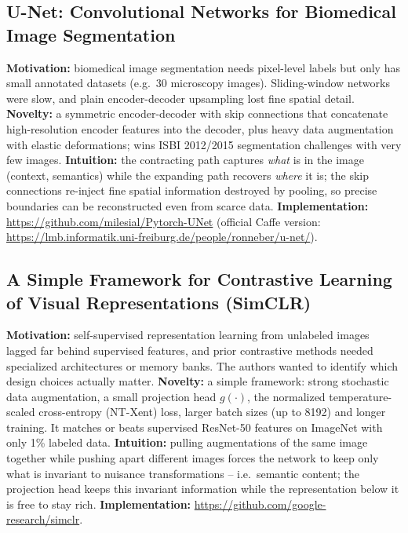 \documentclass[11pt,a4paper]{article}
\begin{document}
\subsection{U-Net: Convolutional Networks for Biomedical Image Segmentation}
\textbf{Motivation:} biomedical image segmentation needs pixel-level labels but only
has small annotated datasets (e.g.\ 30 microscopy images). Sliding-window networks
were slow, and plain encoder-decoder upsampling lost fine spatial detail.
\textbf{Novelty:} a symmetric encoder-decoder with skip connections that concatenate
high-resolution encoder features into the decoder, plus heavy data augmentation with
elastic deformations; wins ISBI 2012/2015 segmentation challenges with very few
images.
\textbf{Intuition:} the contracting path captures \emph{what} is in the image
(context, semantics) while the expanding path recovers \emph{where} it is; the skip
connections re-inject fine spatial information destroyed by pooling, so precise
boundaries can be reconstructed even from scarce data.
\textbf{Implementation:} \url{https://github.com/milesial/Pytorch-UNet}
(official Caffe version: \url{https://lmb.informatik.uni-freiburg.de/people/ronneber/u-net/}).

\subsection{A Simple Framework for Contrastive Learning of Visual Representations (SimCLR)}
\textbf{Motivation:} self-supervised representation learning from unlabeled images
lagged far behind supervised features, and prior contrastive methods needed
specialized architectures or memory banks. The authors wanted to identify which design
choices actually matter.
\textbf{Novelty:} a simple framework: strong stochastic data augmentation, a small
projection head $g(\cdot)$, the normalized temperature-scaled cross-entropy
(NT-Xent) loss, larger batch sizes (up to 8192) and longer training. It matches or
beats supervised ResNet-50 features on ImageNet with only 1\% labeled data.
\textbf{Intuition:} pulling augmentations of the same image together while pushing
apart different images forces the network to keep only what is invariant to nuisance
transformations -- i.e.\ semantic content; the projection head keeps this invariant
information while the representation below it is free to stay rich.
\textbf{Implementation:} \url{https://github.com/google-research/simclr}.
\end{document}
